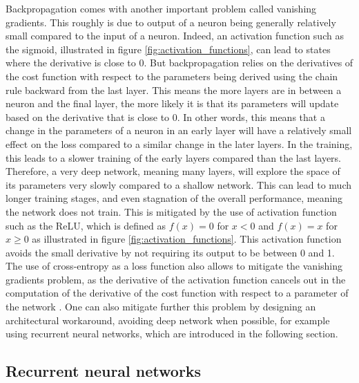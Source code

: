 Backpropagation comes with another important problem called vanishing gradients. This roughly is due to output of a neuron being generally relatively small compared to the input of a neuron. Indeed, an activation function such as the sigmoid, illustrated in figure \ref{fig:activation_functions}, can lead to states where the derivative is close to 0. But backpropagation relies on the derivatives of the cost function with respect to the parameters being derived using the chain rule backward from the last layer. This means the more layers are in between a neuron and the final layer, the more likely it is that its parameters will update based on the derivative that is close to 0. In other words, this means that a change in the parameters of a neuron in an early layer will have a relatively small effect on the loss compared to a similar change in the later layers. In the training, this leads to a slower training of the early layers compared than the last layers. Therefore, a very deep network, meaning many layers, will explore the space of its parameters very slowly compared to a shallow network. This can lead to much longer training stages, and even stagnation of the overall performance, meaning the network does not train. This is mitigated by the use of activation function such as the ReLU, which is defined as $f(x)=0$ for $x < 0$ and $f(x)=x$ for $x \geq 0$ as illustrated in figure \ref{fig:activation_functions}. This activation function avoids the small derivative by not requiring its output to be between 0 and 1. The use of cross-entropy as a loss function also allows to mitigate the vanishing gradients problem, as the derivative of the activation function cancels out in the computation of the derivative of the cost function with respect to a parameter of the network \cite{NN_book}. One can also mitigate further this problem by designing an architectural workaround, avoiding deep network when possible, for example using recurrent neural networks, which are introduced in the following section.



\subsection{Recurrent neural networks}

